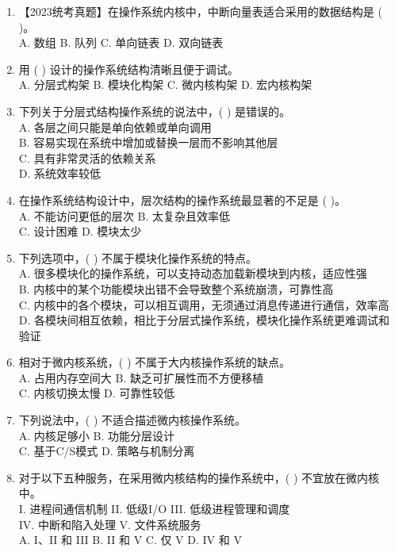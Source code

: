 \documentclass[lang=cn,newtx,10pt,scheme=chinese]{../../elegantbook}
\begin{document}
\begin{enumerate}
    \item 【2023统考真题】在操作系统内核中，中断向量表适合采用的数据结构是 (    )。\\
    A. 数组 \quad B. 队列 \quad C. 单向链表 \quad D. 双向链表

    \item 用 (    ) 设计的操作系统结构清晰且便于调试。\\
    A. 分层式构架 \quad B. 模块化构架 \quad C. 微内核构架 \quad D. 宏内核构架

    \item 下列关于分层式结构操作系统的说法中，(    ) 是错误的。\\
    A. 各层之间只能是单向依赖或单向调用\\
    B. 容易实现在系统中增加或替换一层而不影响其他层\\
    C. 具有非常灵活的依赖关系\\
    D. 系统效率较低

    \item 在操作系统结构设计中，层次结构的操作系统最显著的不足是 (    )。\\
    A. 不能访问更低的层次 \quad B. 太复杂且效率低\\
    C. 设计困难 \quad D. 模块太少

    \item 下列选项中，(    ) 不属于模块化操作系统的特点。\\
    A. 很多模块化的操作系统，可以支持动态加载新模块到内核，适应性强\\
    B. 内核中的某个功能模块出错不会导致整个系统崩溃，可靠性高\\
    C. 内核中的各个模块，可以相互调用，无须通过消息传递进行通信，效率高\\
    D. 各模块间相互依赖，相比于分层式操作系统，模块化操作系统更难调试和验证

    \item 相对于微内核系统，(    ) 不属于大内核操作系统的缺点。\\
    A. 占用内存空间大 \quad B. 缺乏可扩展性而不方便移植\\
    C. 内核切换太慢 \quad D. 可靠性较低

    \item 下列说法中，(    ) 不适合描述微内核操作系统。\\
    A. 内核足够小 \quad B. 功能分层设计\\
    C. 基于C/S模式 \quad D. 策略与机制分离

    \item 对于以下五种服务，在采用微内核结构的操作系统中，(    ) 不宜放在微内核中。\\
    I. 进程间通信机制 \quad II. 低级I/O \quad III. 低级进程管理和调度\\
    IV. 中断和陷入处理 \quad V. 文件系统服务\\
    A. I、II 和 III \quad B. II 和 V \quad C. 仅 V \quad D. IV 和 V


\end{enumerate}
\end{document}
